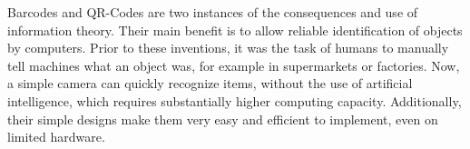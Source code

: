 Barcodes and QR-Codes are two instances of the consequences and use of information theory. Their main benefit is to allow reliable identification of objects by computers. Prior to these inventions, it was the task of humans to manually tell machines what an object was, for example in supermarkets or factories. Now, a simple camera can quickly recognize items, without the use of artificial intelligence, which requires substantially higher computing capacity. Additionally, their simple designs make them very easy and efficient to implement, even on limited hardware.
